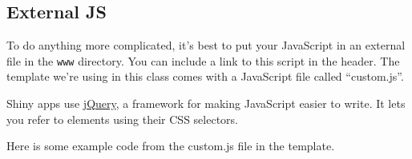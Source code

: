 \documentclass[
]{book}
\newenvironment{Shaded}{\begin{snugshade}}{\end{snugshade}}
\newcommand{\AttributeTok}[1]{\textcolor[rgb]{0.77,0.63,0.00}{#1}}
\newcommand{\BuiltInTok}[1]{#1}
\newcommand{\CommentTok}[1]{\textcolor[rgb]{0.56,0.35,0.01}{\textit{#1}}}
\newcommand{\FunctionTok}[1]{\textcolor[rgb]{0.00,0.00,0.00}{#1}}
\newcommand{\KeywordTok}[1]{\textcolor[rgb]{0.13,0.29,0.53}{\textbf{#1}}}
\newcommand{\NormalTok}[1]{#1}
\newcommand{\OperatorTok}[1]{\textcolor[rgb]{0.81,0.36,0.00}{\textbf{#1}}}
\newcommand{\SpecialCharTok}[1]{\textcolor[rgb]{0.00,0.00,0.00}{#1}}
\newcommand{\StringTok}[1]{\textcolor[rgb]{0.31,0.60,0.02}{#1}}
\begin{document}
\hypertarget{external-js}{%
\subsection{External JS}\label{external-js}}

To do anything more complicated, it's best to put your JavaScript in an external file in the \texttt{www} directory. You can include a link to this script in the header. The template we're using in this class comes with a JavaScript file called ``custom.js''.

\begin{Shaded}
\end{Shaded}

Shiny apps use \href{https://jquery.com/}{jQuery}, a framework for making JavaScript easier to write. It lets you refer to elements using their CSS selectors.

Here is some example code from the custom.js file in the template.

\begin{Shaded}
\end{Shaded}
\end{document}
